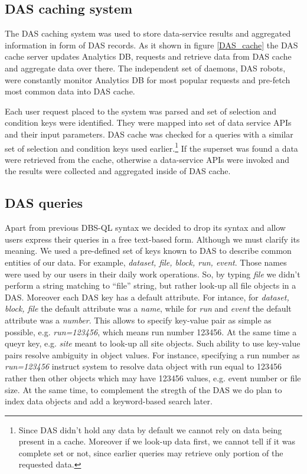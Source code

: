 \documentclass[a4paper]{jpconf}
\begin{document}
\subsection{DAS caching system}
The DAS caching system was used to store data-service results and aggregated
information in form of DAS records. As it shown in figure \ref{DAS_cache} 
the DAS cache server updates Analytics DB, requests and retrieve data from DAS cache
and aggregate data over there. The independent set of daemons, DAS robots, were
constantly monitor Analytics DB for most popular requests and pre-fetch most
common data into DAS cache.

Each user request placed to the system was parsed and set of selection
and condition keys were identified. They were mapped into set of
data service APIs and their input parameters. DAS
cache was checked for a queries with a similar set of selection and condition
keys used earlier.\footnote{Since DAS didn't hold
any data by default we cannot rely on data being present in a cache.
Moreover if we look-up data first, we cannot tell if it was complete
set or not, since earlier queries may retrieve only portion of the requested data.}
If the superset was found a data were
retrieved from the cache, otherwise a data-service APIs were
invoked and the results were collected and aggregated inside of DAS cache.

\subsection{DAS queries}
Apart from previous DBS-QL syntax we decided to drop its syntax and allow users
express their queries in a free text-based form. Although we must clarify its
meaning. We used a pre-defined set of keys known to DAS to describe common
entities of our data. For example, {\it dataset, file, block, run, event}. Those
names were used by our users in their daily work operations. So, by typing
{\it file} we didn't perform a string matching to ``file'' string, but rather
look-up all file objects in a DAS. Moreover each DAS key has a default attribute.
For intance, for {\it dataset, block, file} the default attribute 
was a {\it name}, while for {\it run} and {\it event} the default attribute was 
a {\it number}. This allows to specify key-value pair as simple as possible, e.g.
{\it run=123456}, which means run number 123456. At the same time a queyr 
key, e.g. {\it site} meant to look-up all site objects. Such ability
to use key-value pairs resolve ambiguity in object values. For instance,
specifying a run number as {\it run=123456} instruct system to resolve
data object with run equal to 123456 rather then other objects which may have
123456 values, e.g. event number or file size. At the same time, to complement
the stregth of the DAS we do plan to index data objects and add a keyword-based 
search later.
\end{document}

